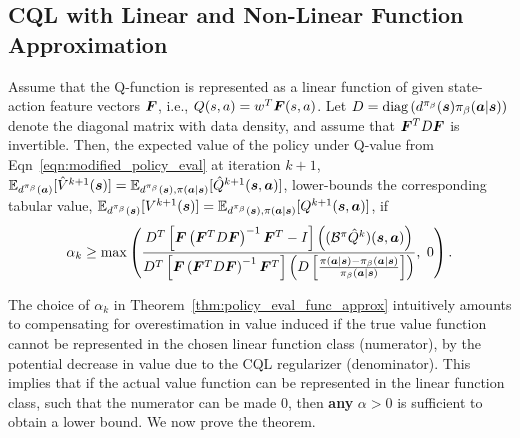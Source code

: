 \subsection{CQL with Linear and Non-Linear Function Approximation}
\label{app:cql_linear_non_linear}
\begin{theorem}
\label{thm:policy_eval_func_approx}
Assume that the Q-function is represented as a linear function of given state-action feature vectors $\boldsymbol{F}$, i.e., $Q(s, a) = w^T \boldsymbol{F}(s, a)$. Let $D = \text{diag}\left(d^{\pi_\beta}(\boldsymbol{s}) {\pi_\beta}(\boldsymbol{a}|\boldsymbol{s})\right)$ denote the diagonal matrix with data density, and assume that $\boldsymbol{F}^T D \boldsymbol{F}$ is invertible. Then, the expected value of the policy under Q-value from Eqn~\ref{eqn:modified_policy_eval} at iteration $k+1$, $\mathbb{E}_{d^{\pi_\beta}(\boldsymbol{a})}[\hat{V}^{k+1}(\boldsymbol{s})] = \mathbb{E}_{d^{\pi_\beta}(\boldsymbol{s}), \pi(\boldsymbol{a}|\boldsymbol{s})}[\hat{Q}^{k+1}(\boldsymbol{s}, \boldsymbol{a})]$, lower-bounds the corresponding tabular value, $\mathbb{E}_{d^{\pi_\beta}(\boldsymbol{s})}[V^{k+1}(\boldsymbol{s})] =\mathbb{E}_{d^{\pi_\beta}(\boldsymbol{s}), \pi(\boldsymbol{a}|\boldsymbol{s})}[Q^{k+1}(\boldsymbol{s}, \boldsymbol{a})]$, if
\begin{equation*}
\small{\alpha_k \geq \max \left(\frac{D^T\left[\boldsymbol{F}\left(\boldsymbol{F}^T D \boldsymbol{F}\right)^{-1} \boldsymbol{F}^T - I \right]\left((\mathcal{B}^\pi\hat{Q}^k)(\boldsymbol{s}, \boldsymbol{a})\right)}{D^T\left[ \boldsymbol{F}\left(\boldsymbol{F}^T D \boldsymbol{F}\right)^{-1} \boldsymbol{F}^T \right] \left(D \left[\frac{\pi(\boldsymbol{a}|\boldsymbol{s}) - {\pi_\beta}(\boldsymbol{a}|\boldsymbol{s})}{{\pi_\beta}(\boldsymbol{a}|\boldsymbol{s})} \right] \right)},~ 0 \right).}
\end{equation*}
\end{theorem}
The choice of $\alpha_k$ in Theorem~\ref{thm:policy_eval_func_approx} intuitively amounts to compensating for overestimation in value induced if the true value function cannot be represented in the chosen linear function class (numerator), by the potential decrease in value due to the CQL regularizer (denominator). This implies that if the actual value function can be represented in the linear function class, such that the numerator can be made $0$, then \textbf{any} $\alpha > 0$ is sufficient to obtain a lower bound. We now prove the theorem.

